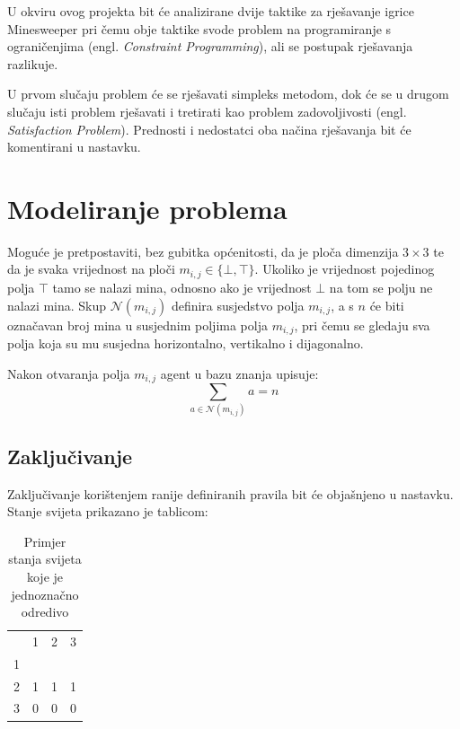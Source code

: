\documentclass{article}
\begin{document}
U okviru ovog projekta bit će analizirane dvije taktike za rješavanje igrice Minesweeper pri čemu obje
taktike svode problem na programiranje s ograničenjima (engl. \textit{Constraint Programming}),
ali se postupak rješavanja razlikuje.

U prvom slučaju problem će se rješavati simpleks metodom, dok će se u drugom slučaju isti
problem rješavati i tretirati kao problem zadovoljivosti (engl. \textit{Satisfaction Problem}).
Prednosti i nedostatci oba načina rješavanja bit će komentirani u nastavku.

\section{Modeliranje problema}

Moguće je pretpostaviti, bez gubitka općenitosti, da je ploča dimenzija $3 \times 3$ te da je
svaka vrijednost na ploči $m_{i, j} \in \{\bot, \top\}$. Ukoliko je vrijednost pojedinog polja
$\top$ tamo se nalazi mina, odnosno ako je vrijednost $\bot$ na tom se polju ne nalazi mina.
Skup $\mathcal{N}(m_{i, j})$ definira susjedstvo polja $m_{i, j}$, a s $n$ će biti označavan broj mina
u susjednim poljima polja $m_{i, j}$, pri čemu se gledaju sva polja koja su mu susjedna horizontalno, vertikalno i dijagonalno.

Nakon otvaranja polja $m_{i, j}$ agent u bazu znanja upisuje:
\begin{equation}
    \sum_{a \in \mathcal{N}(m_{i, j})} a = n
    \label{eq:1}
\end{equation}

\subsection{Zaključivanje}
Zaključivanje korištenjem ranije definiranih pravila bit će objašnjeno u nastavku. Stanje
svijeta prikazano je tablicom:

\begin{table}[ht]
    \centering
    \begin{tabular}{llll}
                           & 1                      & 2                      & 3                      \\ \cline{2-4}
    \multicolumn{1}{l|}{1} & \multicolumn{1}{l|}{}  & \multicolumn{1}{l|}{}  & \multicolumn{1}{l|}{}  \\ \cline{2-4}
    \multicolumn{1}{l|}{2} & \multicolumn{1}{l|}{1} & \multicolumn{1}{l|}{1} & \multicolumn{1}{l|}{1} \\ \cline{2-4}
    \multicolumn{1}{l|}{3} & \multicolumn{1}{l|}{0} & \multicolumn{1}{l|}{0} & \multicolumn{1}{l|}{0}  \\ \cline{2-4}
    \end{tabular}
    \label{table:state1}
    \caption{Primjer stanja svijeta koje je jednoznačno odredivo}
\end{table}
\end{document}
